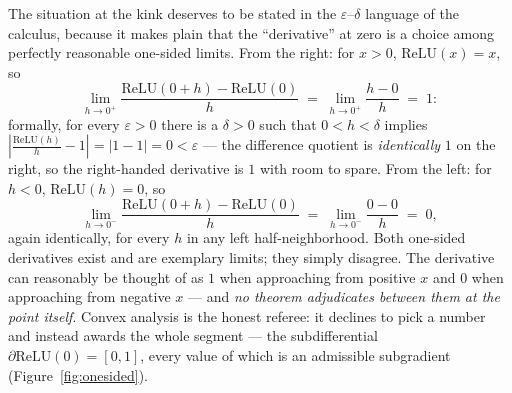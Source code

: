\documentclass[11pt]{article}
\newcommand{\relu}{\mathrm{ReLU}}
\begin{document}
The situation at the kink deserves to be stated in the
$\varepsilon$--$\delta$ language of the calculus, because it makes
plain that the ``derivative'' at zero is a choice among perfectly
reasonable one-sided limits. From the right: for $x > 0$,
$\relu(x) = x$, so
\[
\lim_{h \to 0^{+}} \frac{\relu(0 + h) - \relu(0)}{h}
 \;=\; \lim_{h \to 0^{+}} \frac{h - 0}{h} \;=\; 1 :
\]
formally, for every $\varepsilon > 0$ there is a $\delta > 0$ such
that $0 < h < \delta$ implies
$\left| \frac{\relu(h)}{h} - 1 \right| = |1 - 1| = 0 < \varepsilon$
--- the difference quotient is \emph{identically} $1$ on the right,
so the right-handed derivative is $1$ with room to spare. From the
left: for $h < 0$, $\relu(h) = 0$, so
\[
\lim_{h \to 0^{-}} \frac{\relu(0 + h) - \relu(0)}{h}
 \;=\; \lim_{h \to 0^{-}} \frac{0 - 0}{h} \;=\; 0,
\]
again identically, for every $h$ in any left half-neighborhood. Both
one-sided derivatives exist and are exemplary limits; they simply
disagree. The derivative can reasonably be thought of as $1$ when
approaching from positive $x$ and $0$ when approaching from negative
$x$ --- and \emph{no theorem adjudicates between them at the point
itself}. Convex analysis is the honest referee: it declines to pick a
number and instead awards the whole segment --- the subdifferential
$\partial \relu(0) = [0, 1]$, every value of which is an admissible
subgradient (Figure~\ref{fig:onesided}).
\end{document}
